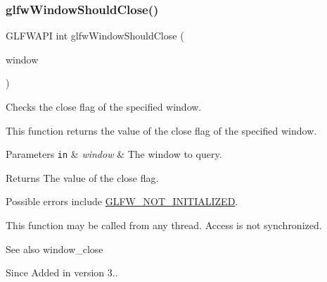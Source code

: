 \subsubsection{\texorpdfstring{glfw\+Window\+Should\+Close()}{glfwWindowShouldClose()}}
{\footnotesize\ttfamily G\+L\+F\+W\+A\+PI int glfw\+Window\+Should\+Close (\begin{DoxyParamCaption}\item[{\hyperlink{group__window_ga3c96d80d363e67d13a41b5d1821f3242}{G\+L\+F\+Wwindow} $\ast$}]{window }\end{DoxyParamCaption})}



Checks the close flag of the specified window. 

This function returns the value of the close flag of the specified window.


\begin{DoxyParams}[1]{Parameters}
\mbox{\tt in}  & {\em window} & The window to query. \\
\hline
\end{DoxyParams}
\begin{DoxyReturn}{Returns}
The value of the close flag.
\end{DoxyReturn}
Possible errors include \hyperlink{group__errors_ga2374ee02c177f12e1fa76ff3ed15e14a}{G\+L\+F\+W\+\_\+\+N\+O\+T\+\_\+\+I\+N\+I\+T\+I\+A\+L\+I\+Z\+ED}.

This function may be called from any thread. Access is not synchronized.

\begin{DoxySeeAlso}{See also}
window\+\_\+close
\end{DoxySeeAlso}
\begin{DoxySince}{Since}
Added in version 3.. 
\end{DoxySince}
